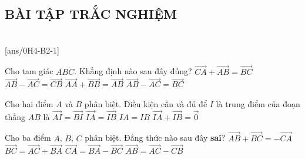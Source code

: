 \subsection{BÀI TẬP TRẮC NGHIỆM}

 \\
\setcounter{ex}{0}
[ans/0H4-B2-1]
\begin{ex}%
	Cho tam giác $ABC$. Khẳng định nào sau đây đúng?
	\choice
	{$\overrightarrow{CA}+\overrightarrow{AB}=\overrightarrow{BC}$}
	{\True $\overrightarrow{AB}-\overrightarrow{AC}=\overrightarrow{CB}$}
	{$\overrightarrow{AA}+\overrightarrow{BB}=\overrightarrow{AB}$}
	{$\overrightarrow{AB}-\overrightarrow{AC}=\overrightarrow{BC}$}
\end{ex}

\begin{ex}%
	Cho hai điểm $A$ và $B$ phân biệt. Điều kiện cần và đủ để $I$ là trung điểm của đoạn thẳng $AB$ là
	\choice
	{$\overrightarrow{AI}=\overrightarrow{BI}$}
	{$\overrightarrow{IA}=\overrightarrow{IB}$}
	{$IA=IB$}
	{\True $\overrightarrow{IA}+\overrightarrow{IB}=\overrightarrow{0}$}
\end{ex}

\begin{ex}%
	Cho ba điểm  $A$, $B$, $C$ phân biệt. Đẳng thức nào sau đây \textbf{sai}?
	\choice
	{
		$\overrightarrow{AB} + \overrightarrow{BC}=- \overrightarrow{CA}$
	}
	{
		$\overrightarrow{BC} = \overrightarrow{AC}+\overrightarrow{BA}$}
	{
		$\overrightarrow{CA} = \overrightarrow{BA}-\overrightarrow{BC}$}
	{
		\True $\overrightarrow{AB} = \overrightarrow{AC}-\overrightarrow{CB}$}
\end{ex}

